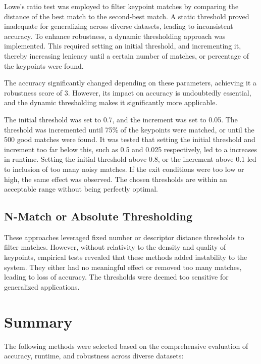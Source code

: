 Lowe's ratio test was employed to filter keypoint matches by comparing the distance of the best match to the second-best match. A static threshold proved inadequate for generalizing across diverse datasets, leading to inconsistent accuracy. To enhance robustness, a dynamic thresholding approach was implemented. This required setting an initial threshold, and incrementing it, thereby increasing leniency until a certain number of matches, or percentage of the keypoints were found.  

The accuracy significantly changed depending on these parameters, achieving it a robustness score of 3. However, its impact on accuracy is undoubtedly essential, and the dynamic thresholding makes it significantly more applicable. 

The initial threshold was set to 0.7, and the increment was set to 0.05. The threshold was incremented until 75\% of the keypoints were matched, or until the 500 good matches were found. It was tested that setting the initial threshold and increment too far below this, such as 0.5 and 0.025 respectively, led to a increases in runtime. Setting the initial threshold above 0.8, or the increment above 0.1 led to inclusion of too many noisy matches. If the exit conditions were too low or high, the same effect was observed. The chosen thresholds are within an acceptable range without being perfectly optimal.


\subsection{{N-Match or Absolute Thresholding}}
These approaches leveraged fixed number or descriptor distance thresholds to filter matches. However, without relativity to the density and quality of keypoints, empirical tests revealed that these methods added instability to the system. They either had no meaningful effect or removed too many matches, leading to loss of accuracy. The thresholds were deemed too sensitive for generalized applications. 



\section{Summary}
The following methods were selected based on the comprehensive evaluation of accuracy, runtime, and robustness across diverse datasets:

